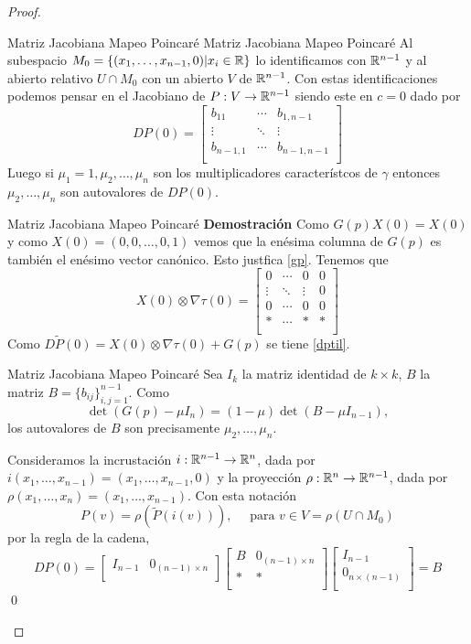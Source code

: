 \begin{proof}
\begin{ejemplo}
{Matriz Jacobiana Mapeo Poincaré}
{Matriz Jacobiana Mapeo Poincaré}
Al subespacio $M_0=\{(x_1,\ldots,x_{n-1},0)|x_i\in\mathbb{R}\}$ lo identificamos con $\mathbb{R}^{n-1}$ y al abierto relativo $U\cap M_0$ con un abierto $V$ de $\mathbb{R}^{n-1}$. 
Con estas identificaciones podemos pensar en el Jacobiano de $P:V\to \mathbb{R}^{n-1}$ siendo este en $c=0$ dado por
 \begin{equation}\label{dp}DP(0)=\begin{bmatrix}
         b_{11}&\cdots&b_{1,n-1}\\
        \vdots &\ddots&\vdots\\
         b_{n-1,1}&\cdots&b_{n-1,n-1}\\
        \end{bmatrix}
\end{equation}
Luego si $\mu_1=1,\mu_2,\ldots,\mu_n$ son los multiplicadores característcos de $\gamma$ entonces $\mu_2,\ldots,\mu_n$ son autovalores de $DP(0)$.







{Matriz Jacobiana Mapeo Poincaré}
\textbf{Demostración} Como $G(p)X(0)=X(0)$ y como $X(0)=(0,0,\ldots,0,1)$ vemos que la enésima columna de $G(p)$ es también el enésimo vector canónico. Esto justfica 
\eqref{gp}.
Tenemos que
\[
 X(0)\otimes\nabla\tau(0)=\begin{bmatrix}
         0&\cdots&0&0\\
        \vdots &\ddots&\vdots&0\\
         0&\cdots&0&0\\
         *&\cdots&*&*\\
        \end{bmatrix}
\]
Como $D\tilde{P}(0)=X(0)\otimes\nabla\tau(0)+G(p)$ se tiene \eqref{dptil}.



{Matriz Jacobiana Mapeo Poincaré}
Sea $I_k$ la matriz identidad de $k\times k$, $B$ la matriz $B=\{b_{ij}\}_{i,j=1}^{n-1}$. Como
\[\det (G(p)-\mu I_n)=(1-\mu)\det (B-\mu I_{n-1}),\]
los autovalores de $B$ son precisamente $\mu_2,\ldots,\mu_n$.

Consideramos la incrustación $i:\mathbb{R}^{n-1}\to\mathbb{R}^n$, dada por $i(x_1,\ldots,x_{n-1})=(x_1,\ldots,x_{n-1},0)$ y la proyección
 $\rho:\mathbb{R}^{n}\to\mathbb{R}^{n-1}$,  dada por $\rho(x_1,\ldots,x_{n})=(x_1,\ldots,x_{n-1})$. Con esta notación
 \[P(v)=\rho(\tilde{P}(i(v))),\quad\text{ para } v\in V=\rho(U\cap M_0)\]
 por la regla de la cadena,
 \[DP(0)=\begin{bmatrix}
         I_{n-1}&0_{(n-1)\times n}\\
        \end{bmatrix}
        \begin{bmatrix}
         B&0_{(n-1)\times n}\\
         *&*\\
        \end{bmatrix}
        \begin{bmatrix}
         I_{n-1}\\0_{n\times (n-1)}\\
        \end{bmatrix} =B
  \]
\qed



\end{ejemplo}
\end{proof}
